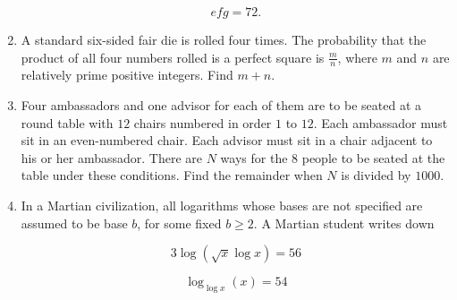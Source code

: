\documentclass{article}
\begin{document}
\begin{enumerate}[label=\arabic*., itemsep=0.5em]
\begin{equation*}
efg=72.
\end{equation*}
\par \vspace{0.5em}\item A standard six-sided fair die is rolled four times. The probability that the product of all four numbers rolled is a perfect square is $\tfrac{m}{n}$, where $m$ and $n$ are relatively prime positive integers. Find $m+n$.\par \vspace{0.5em}\item Four ambassadors and one advisor for each of them are to be seated at a round table with $12$ chairs numbered in order $1$ to $12$. Each ambassador must sit in an even-numbered chair. Each advisor must sit in a chair adjacent to his or her ambassador. There are $N$ ways for the $8$ people to be seated at the table under these conditions. Find the remainder when $N$ is divided by $1000$.\par \vspace{0.5em}\item In a Martian civilization, all logarithms whose bases are not specified are assumed to be base $b$, for some fixed $b\ge2$. A Martian student writes down

\begin{equation*}
3\log(\sqrt{x}\log x)=56
\end{equation*}


\begin{equation*}
\log_{\log x}(x)=54
\end{equation*}


\end{enumerate}
\end{document}
